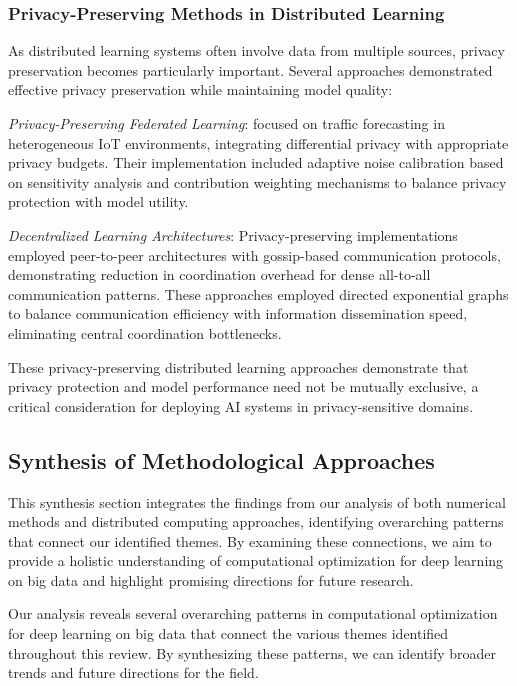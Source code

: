 \documentclass[acmsmall]{acmart}
\begin{document}
\subsubsection{Privacy-Preserving Methods in Distributed Learning}\label{subsubsec:scalability-characteristics-rq22:privacy-preserving-methods-in-distributed-learning}
As distributed learning systems often involve data from multiple sources, privacy preservation becomes particularly important. Several approaches demonstrated effective privacy preservation while maintaining model quality:

\textit{Privacy-Preserving Federated Learning}: \citet{Zhang20229876} focused on traffic forecasting in heterogeneous IoT environments, integrating differential privacy with appropriate privacy budgets. Their implementation included adaptive noise calibration based on sensitivity analysis and contribution weighting mechanisms to balance privacy protection with model utility.

\textit{Decentralized Learning Architectures}: Privacy-preserving implementations employed peer-to-peer architectures with gossip-based communication protocols, demonstrating reduction in coordination overhead for dense all-to-all communication patterns. These approaches employed directed exponential graphs to balance communication efficiency with information dissemination speed, eliminating central coordination bottlenecks.

These privacy-preserving distributed learning approaches demonstrate that privacy protection and model performance need not be mutually exclusive, a critical consideration for deploying AI systems in privacy-sensitive domains.

\subsection{Synthesis of Methodological Approaches}\label{subsec:synthesis-of-methodological-approaches}
This synthesis section integrates the findings from our analysis of both numerical methods and distributed computing approaches, identifying overarching patterns that connect our identified themes. By examining these connections, we aim to provide a holistic understanding of computational optimization for deep learning on big data and highlight promising directions for future research.

Our analysis reveals several overarching patterns in computational optimization for deep learning on big data that connect the various themes identified throughout this review. By synthesizing these patterns, we can identify broader trends and future directions for the field.
\end{document}
